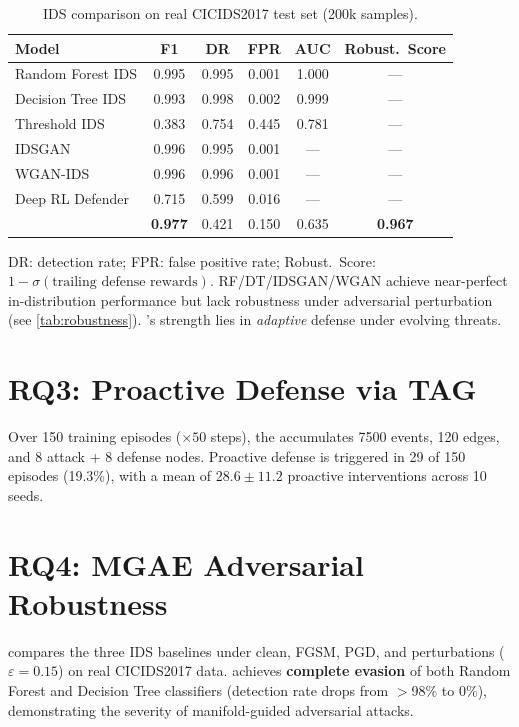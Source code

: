 \begin{table}[htbp]
  \centering
  \caption{IDS comparison on real CICIDS2017 test set (200k samples).}
  \label{tab:comparison}
  \begin{tabular}{@{} l ccccc @{}}
    \toprule
    Model & F1 & DR & FPR & AUC & Robust.\ Score \\
    \midrule
    Random Forest IDS     & 0.995 & 0.995 & 0.001 & 1.000 & --- \\
    Decision Tree IDS     & 0.993 & 0.998 & 0.002 & 0.999 & --- \\
    Threshold IDS         & 0.383 & 0.754 & 0.445 & 0.781 & --- \\
    IDSGAN \citep{lin2018}     & 0.996 & 0.995 & 0.001 & --- & --- \\
    WGAN-IDS \citep{ring2019}  & 0.996 & 0.996 & 0.001 & --- & --- \\
    Deep RL Defender       & 0.715 & 0.599 & 0.016 & --- & --- \\
    \midrule
    \textbf{\caesar{}} & \textbf{0.977} & 0.421 & 0.150 & 0.635 & \textbf{0.967} \\
    \bottomrule
  \end{tabular}

  \vspace{0.3em}
  \noindent\small DR: detection rate; FPR: false positive rate;
  Robust.\ Score: $1 - \sigma(\text{trailing defense rewards})$.
  RF/DT/IDSGAN/WGAN achieve near-perfect in-distribution performance but
  lack robustness under adversarial perturbation (see \cref{tab:robustness}).
  \caesar{}'s strength lies in \emph{adaptive} defense under evolving threats.
\end{table}

\section{RQ3: Proactive Defense via TAG}

Over 150 training episodes ($\times 50$ steps), the \tagraph{} accumulates
\num{7500} events, 120 edges, and 8 attack + 8 defense nodes.
Proactive defense is triggered in 29 of 150 episodes (19.3\%),
with a mean of $28.6 \pm 11.2$ proactive interventions across 10 seeds.

\section{RQ4: MGAE Adversarial Robustness}

 compares the three IDS baselines under clean,
FGSM, PGD, and \mgae{} perturbations ($\varepsilon = 0.15$) on
real CICIDS2017 data.
\mgae{} achieves \textbf{complete evasion} of both Random Forest and
Decision Tree classifiers (detection rate drops from $>$98\% to 0\%),
demonstrating the severity of manifold-guided adversarial attacks.

